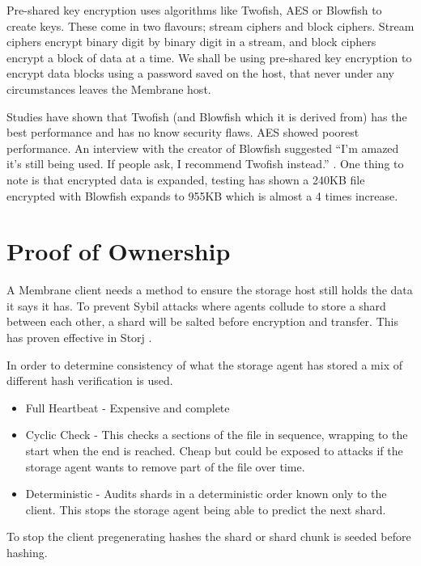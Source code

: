 \documentclass[11pt, a4paper, twocolumn, twoside]{report}
\begin{document}
Pre-shared key encryption uses algorithms like Twofish, AES or Blowfish to create keys. These come in two flavours; stream ciphers and block ciphers. Stream ciphers encrypt binary digit by binary digit in a stream, and block ciphers encrypt a block of data at a time. We shall be using pre-shared key encryption to encrypt data blocks using a password saved on the host, that never under any circumstances leaves the Membrane host.

Studies have shown that Twofish (and Blowfish which it is derived from) has the best performance and has no know security flaws. AES showed poorest performance. \citep*{thakur2011aes, rizvi2011performance, mushtaque2014evaluation} An interview with the creator of Blowfish suggested ``I'm amazed it's still being used. If people ask, I recommend Twofish instead.'' \cite{fish2007bruce}.   One thing to note is that encrypted data is expanded, testing has shown a 240KB file encrypted with Blowfish expands to 955KB which is almost a 4 times increase. \citep{mushtaque2014evaluation}

\section{Proof of Ownership}

A Membrane client needs a method to ensure the storage host still holds the data it says it has. To prevent Sybil attacks where agents collude to store a shard between each other, a shard will be salted before encryption and transfer. This has proven effective in Storj \citep{Wilkinson14storja}.

In order to determine consistency of what the storage agent has stored a mix of different hash verification is used.
\begin{itemize}
 \item Full Heartbeat - Expensive and complete
 \item Cyclic Check - This checks a sections of the file in sequence, wrapping to the start when the end is reached. Cheap but could be exposed to attacks if the storage agent wants to remove part of the file over time.
 \item Deterministic - Audits shards in a deterministic order known only to the client. This stops the storage agent being able to predict the next shard.
\end{itemize}

To stop the client pregenerating hashes the shard or shard chunk is seeded before hashing.
\end{document}
